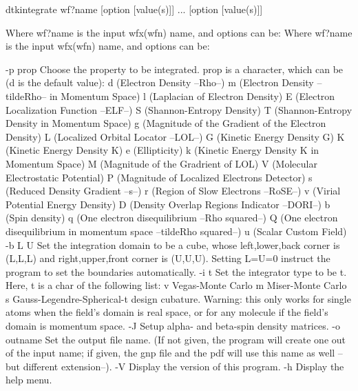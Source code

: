 	dtkintegrate wf?name [option [value(s)]] ... [option [value(s)]]

Where wf?name is the input wfx(wfn) name, and options can be:
Where wf?name is the input wfx(wfn) name, and options can be:

  -p prop   	Choose the property to be integrated. prop is a character,
            	  which can be (d is the default value):
         		d (Electron Density --Rho--)
         		m (Electron Density --tildeRho-- in Momentum Space)
         		l (Laplacian of Electron Density)
         		E (Electron Localization Function --ELF--)
         		S (Shannon-Entropy Density)
         		T (Shannon-Entropy Density in Momentum Space)
         		g (Magnitude of the Gradient of the Electron Density)
         		L (Localized Orbital Locator --LOL--)
         		G (Kinetic Energy Density G)
         		K (Kinetic Energy Density K)
         		e (Ellipticity)
         		k (Kinetic Energy Density K in Momentum Space)
         		M (Magnitude of the Gradrient of LOL)
         		V (Molecular Electrostatic Potential)
         		P (Magnitude of Localized Electrons Detector)
         		s (Reduced Density Gradient --s--)
         		r (Region of Slow Electrons --RoSE--)
         		v (Virial Potential Energy Density)
         		D (Density Overlap Regions Indicator --DORI--)
         		b (Spin density)
         		q (One electron disequilibrium --Rho squared--)
         		Q (One electron disequilibrium in momentum space --tildeRho squared--)
         		u (Scalar Custom Field)
  -b L U    	Set the integration domain to be a cube, whose
            	  left,lower,back corner is (L,L,L) and right,upper,front corner
            	  is (U,U,U). Setting L=U=0 instruct the program to
            	  set the boundaries automatically.
  -i t      	Set the integrator type to be t. Here, t is a char of the following list:
            		v Vegas-Monte Carlo
            		m Miser-Monte Carlo
            		s Gauss-Legendre-Spherical-t design cubature.
            		    Warning: this only works for single atoms when the field's
            		    domain is real space, or for any molecule if the field's
            		    domain is momentum space.
  -J        	Setup alpha- and beta-spin density matrices.
  -o outname 	Set the output file name.
             	  (If not given, the program will create one out of
             	  the input name; if given, the gnp file and the pdf will
             	  use this name as well --but different extension--).
  -V         	Display the version of this program.
  -h         	Display the help menu.

